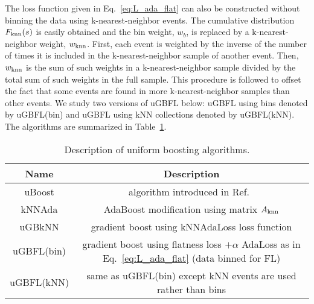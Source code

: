 The loss function given in Eq.~\ref{eq:L_ada_flat} can also be constructed without binning the data using k-nearest-neighbor events.  
The cumulative distribution $F_{\rm knn}(s)$ is easily obtained and the bin weight, $w_b$, is replaced by a k-nearest-neighbor weight, $w_{\rm knn}$.  First, each event is weighted by the inverse of the number of times it is included in the k-nearest-neighbor sample of another event.  Then, $w_{\rm knn}$ is the sum of such weights in a k-nearest-neighbor sample divided by the total sum of such weights in the full sample.   This procedure is followed to offset the fact that some events are found in more k-nearest-neighbor samples than other events.  
We study two versions of uGBFL below: uGBFL using bins denoted by uGBFL(bin) and uGBFL using kNN collections denoted by uGBFL(kNN).  
The algorithms are summarized in Table~\ref{tab:algs}.

\begin{table}
  \begin{center}
    \caption{\label{tab:algs} Description of uniform boosting algorithms.}
    \begin{tabular}{c|c}
      \hline
      Name & Description \\
      \hline
        uBoost & algorithm introduced in Ref.~\cite{ref:uboost}\\
      \hline
        kNNAda & AdaBoost modification using matrix $A_{\rm knn}$ \\
        uGBkNN & gradient boost using kNNAdaLoss loss function \\
        uGBFL(bin) & gradient boost using flatness loss $+ \alpha$ AdaLoss as in Eq.~\ref{eq:L_ada_flat} (data binned for FL) \\
        uGBFL(kNN) & same as uGBFL(bin) except kNN events are used rather than bins \\
      \hline
    \end{tabular}
  \end{center}
\end{table}


